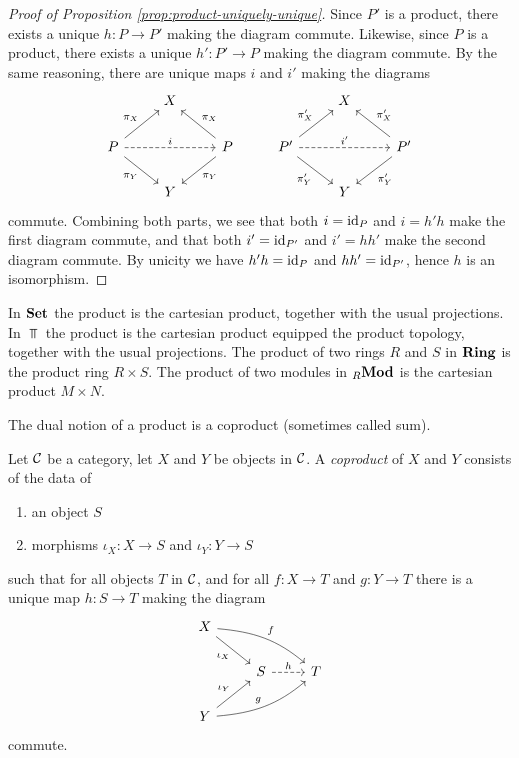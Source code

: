 \begin{proof}[Proof of Proposition \ref{prop:product-uniquely-unique}]
Since $P'$ is a product, there exists a unique $h\colon P \to P'$ making the diagram commute. Likewise, since $P$ is a product, there exists a unique $h'\colon P'\to P$ making the diagram commute. By the same reasoning, there are unique maps $i$ and $i'$ making the diagrams
\[
\begin{tikzcd}
& X & & & X & \\
P \arrow{ru}{\pi_X} \arrow[swap]{rd}{\pi_Y} \arrow[dashed]{rr}{i}
	 & &  P \arrow[swap]{lu}{\pi_X} \arrow{ld}{\pi_Y} 
& P' \arrow{ru}{\pi'_X} \arrow[swap]{rd}{\pi'_Y} \arrow[dashed]{rr}{i'}
	 & &  P' \arrow[swap]{lu}{\pi_X'} \arrow{ld}{\pi_Y'} \\
& Y & & & Y &
\end{tikzcd}
\]
commute. Combining both parts, we see that both $i={\rm id}_P$ and $i=h'h$ make the first diagram commute, and that both $i'={\rm id}_{P'}$ and $i'=hh'$ make the second diagram commute. By unicity we have $h'h={\rm id}_P$ and $hh'={\rm id}_{P'}$, hence $h$ is an isomorphism.
\end{proof}


\begin{examples}
In $\mathbf{Set}$ the product is the cartesian product, together with the usual projections. In $\Top$ the product is the cartesian product equipped the product topology, together with the usual projections. The product of two rings  $R$ and $S$ in $\mathbf{Ring}$ is the product ring $R\times S$.  The product of two modules in ${}_R\mathbf{Mod}$ is the cartesian product  $M \times N$.
\end{examples}



The dual notion of a product is a coproduct  (sometimes called sum).

\begin{definition}
Let ${\mathcal{C}}$ be a category, let $X$ and $Y$ be objects in ${\mathcal{C}}$.  A \emph{coproduct} of $X$ and $Y$
consists of the data of
\begin{enumerate}
\item an object $S$
\item  morphisms $\iota_X\colon X \to S$ and $\iota_Y\colon Y \to S$
\end{enumerate}
such that for all objects $T$ in ${\mathcal{C}}$, and for all $f\colon X\to T$ and $g\colon Y\to T$ there is a unique map $h\colon S \to T$ making the diagram 
\[
\begin{tikzcd}
X \arrow[swap]{rd}{\iota_X} \arrow[out=-5,in=140]{rrd}{f} & & \\
& S \arrow[dashed]{r}{h} & T \\
Y \arrow{ru}{\iota_Y} \arrow[out=5,in=-140]{rru}{g} & & 
\end{tikzcd}
\]
commute.
\end{definition}

